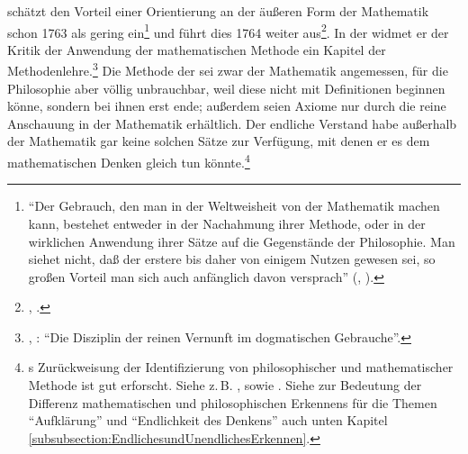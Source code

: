 \label{Abschnitt:AufklaerungundMuendigkeitdurchKompetenz-Ende}
 schätzt den Vorteil einer Orientierung an der äußeren Form
der Mathematik schon 1763 als gering
ein\footnote{\enquote{Der Gebrauch, den man in der Weltweisheit von der Mathematik machen kann, bestehet
entweder in der Nachahmung ihrer Methode, oder in der wirklichen Anwendung ihrer
Sätze auf die Gegenstände der Philosophie. Man siehet nicht, daß der erstere
bis daher von einigem Nutzen gewesen sei, so großen Vorteil man sich auch
anfänglich davon versprach}
(\cite[][A~i]{Kant:VersuchdenBegriffdernegativenGroessenindieWeltweisheiteinzufuehren1977},
\cite[][II: 167.2--6]{Kant:GesammelteWerke1900ff.}).} und führt dies 1764 weiter
aus\footnote{\cite[Vgl.][A
71--79]{Kant:UntersuchungueberdieDeutlichkeitderGrundsaetzedernatuerlichenTheologieundderMoral1977},
\cite[][II: 276.1--283.9]{Kant:GesammelteWerke1900ff.}.}. In der  widmet er der Kritik der Anwendung der mathematischen Methode ein Kapitel der Methodenlehre.\footnote{\cite[Vgl.][B~740-766]{Kant:KritikderreinenVernunft2003},
\cite[][III: 468.22--483.32]{Kant:GesammelteWerke1900ff.}: \enquote{Die
Disziplin der reinen Vernunft im dogmatischen Gebrauche}.} Die Methode der  sei
zwar der Mathematik angemessen, für die Philosophie aber völlig unbrauchbar,
weil diese nicht mit Definitionen beginnen könne, sondern bei ihnen erst ende;
außerdem seien Axiome nur durch die reine Anschauung in der Mathematik
erhältlich. Der endliche Verstand habe außerhalb der Mathematik gar keine
solchen Sätze zur Verfügung, mit denen er es dem mathematischen Denken gleich tun
könnte.\footnote{s Zurückweisung der Identifizierung von
philosophischer und mathematischer Methode ist gut erforscht. Siehe z.\,B.
\cite[][26--67]{Engfer:PhilosophiealsAnalysis1982}, sowie
\cite[][42--101]{Wolff-Metternich:DieUeberwindungdesmathematischenErkenntnisideals1995}.
Siehe zur Bedeutung der Differenz mathematischen und philosophischen Erkennens
für die Themen \enquote{Aufklärung} und \enquote{Endlichkeit des Denkens} auch
unten Kapitel \ref{subsubsection:EndlichesundUnendlichesErkennen}.}

